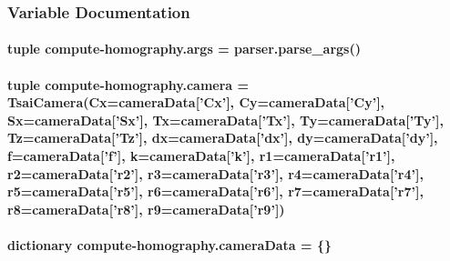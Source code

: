 \subsubsection{Variable Documentation}
\hypertarget{namespacecompute-homography_aab37023421b1c3ecc8a7648f41778972}{
\paragraph[{args}]{\setlength{\rightskip}{0pt plus 5cm}tuple compute-\/homography.\-args = parser.\-parse\-\_\-args()}}\label{namespacecompute-homography_aab37023421b1c3ecc8a7648f41778972}
\hypertarget{namespacecompute-homography_ad2a5f410a3c22a6e1d49deb87f0d1886}{
\paragraph[{camera}]{\setlength{\rightskip}{0pt plus 5cm}tuple compute-\/homography.\-camera = Tsai\-Camera(Cx={\bf camera\-Data}\mbox{[}'Cx'\mbox{]}, Cy={\bf camera\-Data}\mbox{[}'Cy'\mbox{]}, Sx={\bf camera\-Data}\mbox{[}'Sx'\mbox{]}, Tx={\bf camera\-Data}\mbox{[}'Tx'\mbox{]}, Ty={\bf camera\-Data}\mbox{[}'Ty'\mbox{]}, Tz={\bf camera\-Data}\mbox{[}'Tz'\mbox{]}, dx={\bf camera\-Data}\mbox{[}'dx'\mbox{]}, dy={\bf camera\-Data}\mbox{[}'dy'\mbox{]}, {\bf f}={\bf camera\-Data}\mbox{[}'{\bf f}'\mbox{]}, k={\bf camera\-Data}\mbox{[}'k'\mbox{]}, r1={\bf camera\-Data}\mbox{[}'r1'\mbox{]}, r2={\bf camera\-Data}\mbox{[}'r2'\mbox{]}, r3={\bf camera\-Data}\mbox{[}'r3'\mbox{]}, r4={\bf camera\-Data}\mbox{[}'r4'\mbox{]}, r5={\bf camera\-Data}\mbox{[}'r5'\mbox{]}, r6={\bf camera\-Data}\mbox{[}'r6'\mbox{]}, r7={\bf camera\-Data}\mbox{[}'r7'\mbox{]}, r8={\bf camera\-Data}\mbox{[}'r8'\mbox{]}, r9={\bf camera\-Data}\mbox{[}'r9'\mbox{]})}}\label{namespacecompute-homography_ad2a5f410a3c22a6e1d49deb87f0d1886}
\hypertarget{namespacecompute-homography_a2be768add5fef829cc17c08693bba49b}{
\paragraph[{camera\-Data}]{\setlength{\rightskip}{0pt plus 5cm}dictionary compute-\/homography.\-camera\-Data = \{\}}}\label{namespacecompute-homography_a2be768add5fef829cc17c08693bba49b}
